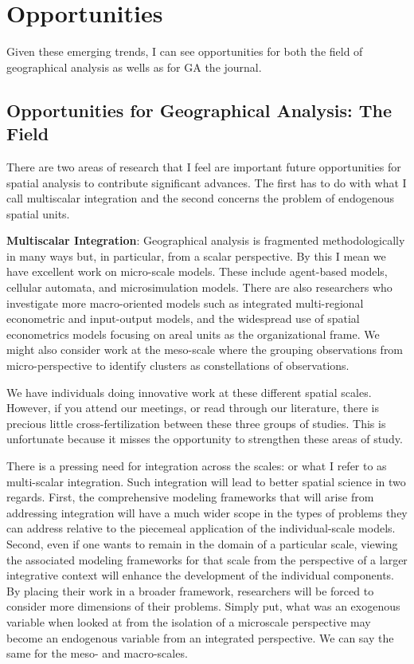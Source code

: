 \documentclass[11pt]{article}
\begin{document}
\section{Opportunities}
\label{sec:org000df0f}
Given these emerging trends, I can see opportunities for both the field of
geographical analysis as wells as for GA the journal.
\subsection{Opportunities for Geographical Analysis: The Field}
\label{sec:org52b49a6}
There are two areas of research that I feel are important future
opportunities for spatial analysis to contribute significant advances. The
first has to do with what I call multiscalar integration and the second
concerns the problem of endogenous spatial units.

\textbf{Multiscalar Integration}: Geographical analysis is fragmented methodologically
in many ways but, in particular, from a scalar perspective. By this I mean we
have excellent work  on micro-scale models. These include agent-based
models, cellular automata, and microsimulation models. There are also
researchers who investigate more macro-oriented models such as integrated
multi-regional econometric and input-output models, and the widespread use of
spatial econometrics models  focusing on areal units as the
organizational frame. We might also consider work at the meso-scale where
the grouping observations from micro-perspective to identify clusters
as constellations of observations.

We have individuals doing innovative work at these different spatial scales.
However, if you attend our meetings, or read through our literature, there is
precious little cross-fertilization between these three groups of studies. This
is unfortunate because it misses the opportunity to strengthen these areas of
study.

There is a pressing need for integration across the scales: or what I refer to
as multi-scalar integration. Such integration will lead to better spatial
science in two regards. First, the comprehensive modeling frameworks that will
arise from addressing integration will have a much wider scope in the types of
problems they can address relative to the piecemeal application of the
individual-scale models. Second, even if one wants to remain in the domain of a
particular scale, viewing the associated modeling frameworks for that scale
from the perspective of a larger integrative context will enhance the development
of the individual components. By placing their work in a broader framework,
researchers will be forced to consider more dimensions of their problems.
Simply put, what was an exogenous variable when looked at from the isolation of
a microscale perspective may become an endogenous variable from an integrated
perspective. We can say the same for the meso- and macro-scales.
\end{document}
